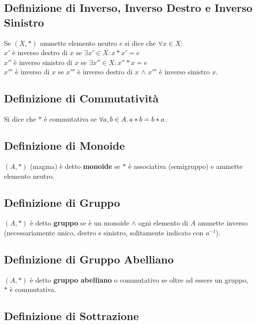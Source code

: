 \documentclass[a4paper, twoside, italian, 11pt]{book}
\begin{document}
\subsection{Definizione di Inverso, Inverso Destro e Inverso Sinistro}

Se $(X, *)$ ammette elemento neutro $e$ si dice che $\forall x \in X$: \\

$x'$ è inverso destro di $x$ se $\exists x' \in X : x * x' = e$ \\
\indent
$x''$ è inverso sinistro di $x$ se $\exists x'' \in X : x'' * x = e$ \\
\indent
$x'''$ è inverso di $x$ se $x'''$ è inverso destro di $x$ $\land$ $x'''$ è inverso sinistro $x$.


\subsection{Definizione di Commutatività}

Si dice che $*$ è commutativa se $\forall a,b \in A \ldotp a * b = b * a$.


\subsection{Definizione di Monoide}

$(A, *)$ (magma) è detto \textbf{monoide} se $*$ è associativa (semigruppo) e ammette elemento neutro.


\subsection{Definizione di Gruppo}

$(A, *)$ è detto \textbf{gruppo} se è un monoide $\land$ ogni elemento di $A$ ammette inverso (necessariamente unico, destro e sinistro, solitamente indicato con $a^{-1}$).


\subsection{Definizione di Gruppo Abelliano}

$(A, *)$ è detto \textbf{gruppo abelliano} o commutativo se oltre ad essere un gruppo, $*$ è commutativa.


\subsection{Definizione di Sottrazione}
\end{document}
